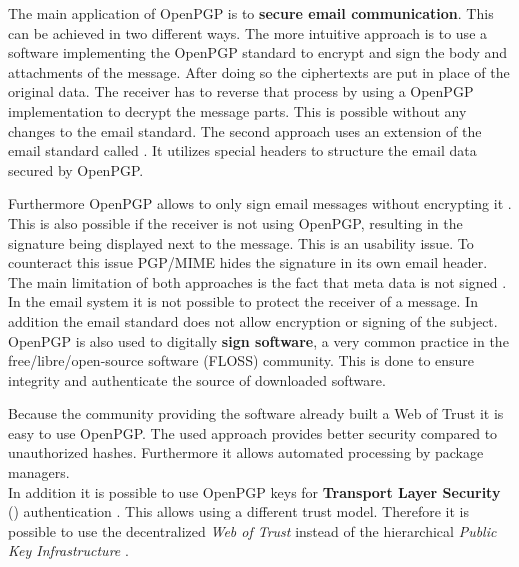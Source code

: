 The main application of OpenPGP is to \textbf{secure email communication}. This can be achieved in two different ways. The more intuitive approach is to use a software implementing the OpenPGP standard to encrypt and sign the body and attachments of the message. After doing so the ciphertexts are put in place of the original data. The receiver has to reverse that process by using a OpenPGP implementation to decrypt the message parts. This is possible without any changes to the email standard. The second approach uses an extension of the email standard called  \citep{RFC3156}. It utilizes special headers to structure the email data secured by OpenPGP.

Furthermore OpenPGP allows to only sign email messages without encrypting it \cite[section 7]{RFC4880}. This is also possible if the receiver is not using OpenPGP, resulting in the signature being displayed next to the message. This is an usability issue. To counteract this issue PGP/MIME hides the signature in its own email header. \\


The main limitation of both approaches is the fact that meta data is not signed \cite{Green2014}. In the email system it is not possible to protect the receiver of a message. In addition the email standard does not allow encryption or signing of the subject. \\

OpenPGP is also used to digitally \textbf{sign software}, a very common practice in the free/libre/open-source software (FLOSS) community. This is done to ensure integrity and authenticate the source of downloaded software. 

Because the community providing the software already built a Web of Trust it is easy to use OpenPGP. The used approach provides better security compared to unauthorized hashes. Furthermore it allows automated processing by package managers. \\


In addition it is possible to use OpenPGP keys for \textbf{Transport Layer Security} () authentication \cite{RFC6091}. This allows using a different trust model. Therefore it is possible to use the decentralized \textit{Web of Trust} instead of the hierarchical \textit{Public Key Infrastructure} \citep{RFC5280}. 

